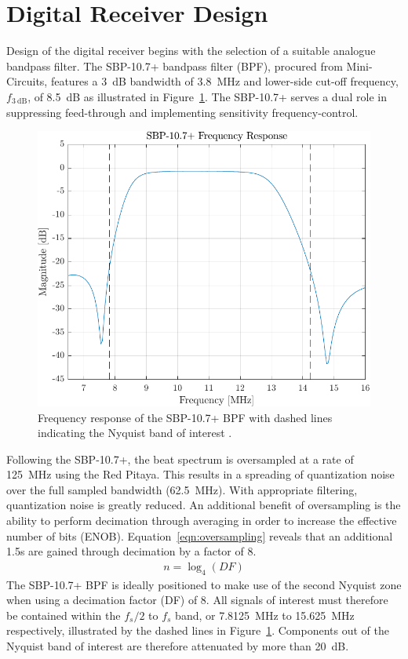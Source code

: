 \documentclass[a4paper,11pt]{report}
\begin{document}
\section{Digital Receiver Design}
Design of the digital receiver begins with the selection of a suitable analogue bandpass filter. The SBP-10.7+ bandpass filter (BPF), procured from Mini-Circuits, features a \SI{3}{\dB} bandwidth of \SI{3.8}{MHz} and lower-side cut-off frequency, $ f_{\SI{3}{\dB}} $, of \SI{8.5}{\dB} as illustrated in Figure~\ref{fig:band_pass_response}. The SBP-10.7+ serves a dual role in suppressing feed-through and implementing sensitivity frequency-control. 
\begin{figure}[h!]
    \begin{center}
        \includegraphics[width=\textwidth]{images/band_pass_response}
        \caption{Frequency response of the SBP-10.7+ BPF with dashed lines indicating the Nyquist band of interest .}
        \label{fig:band_pass_response}
    \end{center}
\end{figure}

Following the SBP-10.7+, the beat spectrum is oversampled at a rate of \SI{125}{\MHz} using the Red Pitaya. This results in a spreading of quantization noise over the full sampled bandwidth (\SI{62.5}{\MHz}). With appropriate filtering, quantization noise is greatly reduced. An additional benefit of oversampling is the ability to perform decimation through averaging in order to increase the effective number of bits (ENOB). Equation~\ref{eqn:oversampling} reveals that an additional \SI{1.5}{\bit}s are gained through decimation by a factor of 8.
\begin{align} \label{eqn:oversampling}
n = \log_4 (DF)
\end{align}
The SBP-10.7+ BPF is ideally positioned to make use of the second Nyquist zone when using a decimation factor (DF) of 8. All signals of interest must therefore be contained within the $ f_{s}/2 $ to $ f_{s} $ band, or \SI{7.8125}{\MHz} to \SI{15.625}{\MHz} respectively, illustrated by the dashed lines in Figure~\ref{fig:band_pass_response}. Components out of the Nyquist band of interest are therefore attenuated by more than \SI{20}{\dB}. 
\end{document}
